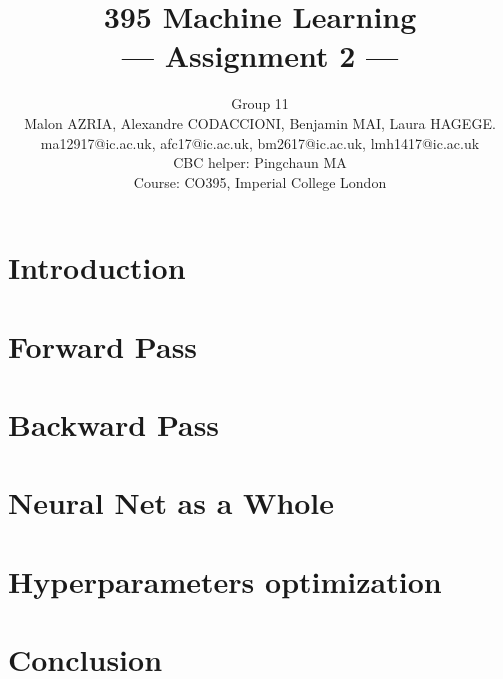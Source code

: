\documentclass[a4paper,11pt]{article}
\title{395 Machine Learning\\\Large{--- Assignment 2 ---}}
\author{Group 11\\Malon AZRIA, Alexandre CODACCIONI, Benjamin MAI,
  Laura HAGEGE.\\
  ma12917@ic.ac.uk, afc17@ic.ac.uk, bm2617@ic.ac.uk, lmh1417@ic.ac.uk \\
       \small{CBC helper: Pingchaun MA}\\
       \small{Course: CO395, Imperial College London}
}
\begin{document}
\maketitle

\section{Introduction}
    

\section{Forward Pass}
    
 
    
\section{Backward Pass}
    

\section{Neural Net as a Whole}
     

\section{Hyperparameters optimization}
	

      
\section{Conclusion}
    
\end{document}
